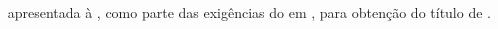 
   \thispagestyle{empty}
   \setcounter{page}{0}
\begin{spacing}{1}
	\begin{center}
		\vspace*{-0.5cm}
		{\MakeUppercase{\nome} \\ }
		
		
		\vspace*{8cm}
		{\MakeUppercase{\textbf{\titulo}} \\ }
	\end{center}
	\vspace*{4cm}
	\singlespacing
	\begin{flushright}
		\begin{minipage}{7.5cm}
			{\tipo~ apresentada à \instituicao, como parte
				das exigências do \curso em \programa, para
				obtenção do título de \textit{\titulop}.}
		\end{minipage}
	\end{flushright}
	\vfill
	
	\begin{center}
	\MakeUppercase{\cidade}
	
	\MakeUppercase{\estado}
	
	\MakeUppercase{\ano}
	
	
	\end{center}
	
\end{spacing}
